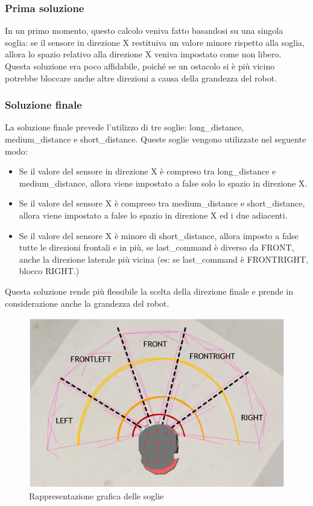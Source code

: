 \documentclass[]{article}
\begin{document}
\subsubsection*{Prima soluzione}
In un primo momento, questo calcolo veniva fatto basandosi su una singola soglia: se il sensore in direzione X restituiva un valore minore rispetto alla soglia, allora lo spazio relativo alla direzione X veniva impostato come non libero. Questa soluzione era poco affidabile, poiché se un ostacolo si è più vicino potrebbe bloccare anche altre direzioni a causa della grandezza del robot.

\subsubsection*{Soluzione finale}
La soluzione finale prevede l'utilizzo di tre soglie: long\_distance, medium\_distance e short\_distance. Queste soglie vengono utilizzate nel seguente modo:
\begin{itemize}
    \item Se il valore del sensore in direzione X è compreso tra long\_distance e medium\_distance, allora viene impostato a false solo lo spazio in direzione X.
    \item Se il valore del sensore X è compreso tra medium\_distance e short\_distance, allora viene impostato a false lo spazio in direzione X ed i due adiacenti.
    \item Se il valore del sensore X è minore di short\_distance, allora imposto a false tutte le direzioni frontali e in più, se last\_command è diverso da FRONT, anche la direzione laterale più vicina (es: se last\_command è FRONTRIGHT, blocco RIGHT.)
\end{itemize}
Questa soluzione rende più flessibile la scelta della direzione finale e prende in considerazione anche la grandezza del robot.

\begin{figure}[H]
    \centering
    \includegraphics[width=0.6\linewidth]{immagini/soglie_obstacle_avoidance.png}
    \caption{Rappresentazione grafica delle soglie}
    
\end{figure}
\end{document}
